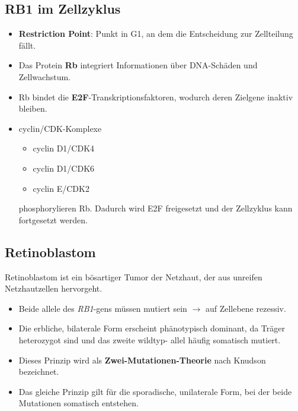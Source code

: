 
\subsection{RB1 im Zellzyklus}\label{subsec:rb1-im-zellzyklus}
\begin{itemize}
    \item \textbf{Restriction Point}: Punkt in G1, an dem die Entscheidung zur Zellteilung fällt.
    \item Das Protein \textbf{Rb} integriert Informationen über DNA-Schäden und Zellwachstum.
    \item Rb bindet die \textbf{E2F}-Transkriptionsfaktoren, wodurch deren Zielgene inaktiv bleiben.
    \item \gls{cyclin}/CDK-Komplexe
    \begin{itemize}
        \item \gls{cyclin} D1/CDK4
        \item \gls{cyclin} D1/CDK6
        \item \gls{cyclin} E/CDK2
    \end{itemize}
    phosphorylieren Rb. Dadurch wird E2F freigesetzt und der Zellzyklus kann fortgesetzt werden.
\end{itemize}

\subsection{Retinoblastom}\label{subsec:retinoblastom}

Retinoblastom ist ein bösartiger Tumor der Netzhaut, der aus unreifen Netzhautzellen hervorgeht.

\begin{itemize}
    \item Beide \gls{allel}e des \textit{RB1}-\gls{gen}s müssen mutiert sein $\rightarrow$ auf Zellebene rezessiv.
    \item Die erbliche, bilaterale Form erscheint phänotypisch dominant, da Träger heterozygot sind und das zweite \gls{wildtyp}-
    \gls{allel} häufig somatisch mutiert.
    \item Dieses Prinzip wird als \textbf{Zwei-Mutationen-Theorie} nach Knudson bezeichnet.
    \item Das gleiche Prinzip gilt für die sporadische, unilaterale Form, bei der beide Mutationen somatisch entstehen.
\end{itemize}



